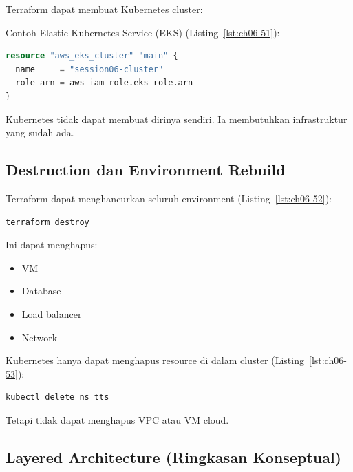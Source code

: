 Terraform dapat membuat Kubernetes cluster:

Contoh Elastic Kubernetes Service (EKS) (Listing~\ref{lst:ch06-51}):

\begin{lstlisting}[language=terraform, caption={Potongan kode Terraform pada Provisioning Kubernetes Cluster Itu Sendiri}, label={lst:ch06-51}]
resource "aws_eks_cluster" "main" {
  name     = "session06-cluster"
  role_arn = aws_iam_role.eks_role.arn
}
\end{lstlisting}

Kubernetes tidak dapat membuat dirinya sendiri.
Ia membutuhkan infrastruktur yang sudah ada.

\subsection{Destruction dan Environment Rebuild}

Terraform dapat menghancurkan seluruh environment (Listing~\ref{lst:ch06-52}):

\begin{lstlisting}[language=bash, caption={Menghapus sumber daya Terraform}, label={lst:ch06-52}]
terraform destroy
\end{lstlisting}

Ini dapat menghapus:

\begin{itemize}
    \item VM
    \item Database
    \item Load balancer
    \item Network
\end{itemize}

Kubernetes hanya dapat menghapus resource di dalam cluster (Listing~\ref{lst:ch06-53}):

\begin{lstlisting}[language=bash, caption={Mengubah objek Kubernetes (8)}, label={lst:ch06-53}]
kubectl delete ns tts
\end{lstlisting}

Tetapi tidak dapat menghapus VPC atau VM cloud.

\subsection{Layered Architecture (Ringkasan Konseptual)}

